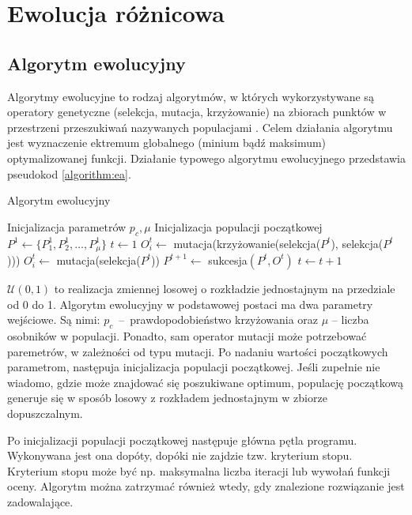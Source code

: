 \documentclass[a4paper,onecolumn,oneside,12pt,wide,floatssmall]{mwrep}
\theoremstyle{definition}
\theoremstyle{plain}%
\theoremstyle{remark}
\begin{document}
\chapter{Ewolucja różnicowa}

\section{Algorytm ewolucyjny}

Algorytmy ewolucyjne to rodzaj algorytmów, w których wykorzystywane są operatory genetyczne (selekcja,
mutacja, krzyżowanie) na zbiorach punktów w przestrzeni przeszukiwań nazywanych populacjami \cite{jarabas}. 
Celem działania algorytmu jest
wyznaczenie ektremum globalnego (minium bądź maksimum) optymalizowanej funkcji.
Działanie typowego algorytmu ewolucyjnego przedstawia pseudokod \ref{algorithm:ea}.

\begin{algorithm}[H]
\caption{Algorytm ewolucyjny}
\label{algorithm:ea}
\begin{algorithmic}[1]
\State Inicjalizacja parametrów $p_c, \mu$
\State Inicjalizacja populacji początkowej $P^1 \gets \{P^1_1, P^1_2, \ldots, P^1_{\mu}\}$
\State $t \gets 1$
      \State $O^t_i \gets$ mutacja(krzy{\.z}owanie(selekcja($P^t$), selekcja($P^t$)))
    \Else
      \State $O^t_i \gets$ mutacja(selekcja($P^t$))
    \EndIf
  \EndFor
  \State $P^{t+1} \gets$ sukcesja$(P^t, O^t)$
  \State $t \gets t+1$
\EndWhile
\end{algorithmic}
\end{algorithm}

$\mathcal{U}(0, 1)$ to realizacja zmiennej losowej o rozkładzie jednostajnym na przedziale od 0 do 1.
Algorytm ewolucyjny w podstawowej postaci ma dwa parametry wejściowe.
Są nimi: $p_c$~--~prawdopodobieństwo krzyżowania oraz $\mu$ -- liczba osobników w populacji.
Ponadto, sam operator mutacji może potrzebować paremetrów, w zależności od typu mutacji.
Po nadaniu wartości początkowych parametrom, następuja inicjalizacja populacji początkowej. 
Jeśli zupełnie nie wiadomo, gdzie może znajdować się poszukiwane optimum, 
populację początkową generuje się w sposób losowy z rozkładem jednostajnym w zbiorze dopuszczalnym.

Po inicjalizacji populacji początkowej następuje główna pętla programu. 
Wykonywana jest ona dopóty, dopóki nie zajdzie tzw. kryterium stopu. 
Kryterium stopu może być np. maksymalna liczba iteracji lub wywołań funkcji oceny.
Algorytm można zatrzymać również wtedy, gdy znalezione rozwiązanie jest zadowalające. 
\end{document}

